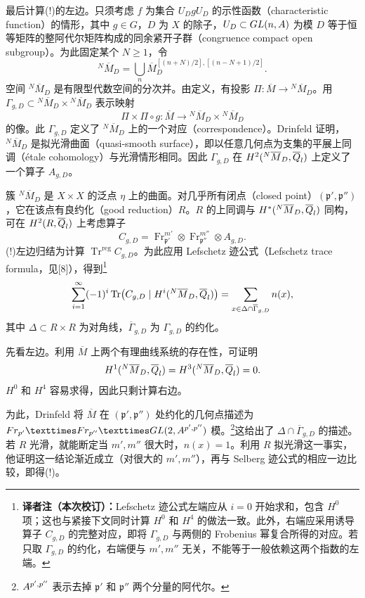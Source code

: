 最后计算(!)的左边。只须考虑 $f$ 为集合 $U_DgU_D$ 的示性函数（characteristic function）的情形，其中 $g\in G$，$D$ 为 $X$ 的除子，$U_D\subset GL(n,A)$ 为模 $D$ 等于恒等矩阵的整阿代尔矩阵构成的同余紧开子群（congruence compact open subgroup）。为此固定某个 $N\geq1$，令
\[
 {}^N\overline M_D=
 \bigcup_n\overline M_D^{[(n+N)/2],[(n-N+1)/2]}.
\]
空间 ${}^N\overline M_D$ 是有限型代数空间的分次并。由定义，有投影 $\Pi:\overline M\longrightarrow{}^N\overline M_D$。用
$\Gamma_{g,D}\subset{}^N\overline M_D\times{}^N\overline M_D$ 表示映射
\[
 \Pi\times\Pi\circ g:\overline M
 \longrightarrow{}^N\overline M_D\times{}^N\overline M_D
\]
的像。此 $\Gamma_{g,D}$ 定义了 ${}^N\overline M_D$ 上的一个对应（correspondence）。Drinfeld 证明，${}^N\overline M_D$ 是拟光滑曲面（quasi-smooth surface），即以任意几何点为支集的平展上同调（étale cohomology）与光滑情形相同。因此 $\Gamma_{g,D}$ 在 $H^2({}^N\overline M_D,\overline{Q}_l)$ 上定义了一个算子 $A_{g,D}$。

簇 ${}^N\overline M_D$ 是 $X\times X$ 的泛点 $\eta$ 上的曲面。对几乎所有闭点（closed point）$(\mathfrak p',\mathfrak p'')$，它在该点有良约化（good reduction）$R$。$R$ 的上同调与 $H^*({}^N\overline M_D,\overline{Q}_l)$ 同构，可在 $H^2(R,\overline{Q}_l)$ 上考虑算子
\[
 C_{g,D}=\operatorname{Fr}_{\mathfrak p'}^{m'}\otimes
 \operatorname{Fr}_{\mathfrak p''}^{m''}\otimes A_{g,D}.
\]
(!)左边归结为计算 $\operatorname{Tr}^{\mathrm{reg}}C_{g,D}$。为此应用 Lefschetz 迹公式（Lefschetz trace formula，见[8]），得到\footnote{\textbf{译者注（本次校订）：}Lefschetz 迹公式左端应从 $i=0$ 开始求和，包含 $H^0$ 项；这也与紧接下文同时计算 $H^0$ 和 $H^4$ 的做法一致。此外，右端应采用诱导算子 $C_{g,D}$ 的完整对应，即将 $\Gamma_{g,D}$ 与两侧的 Frobenius 幂复合所得的对应。若只取 $\Gamma_{g,D}$ 的约化，右端便与 $m',m''$ 无关，不能等于一般依赖这两个指数的左端。}
\[
 \sum_{i=1}^{\infty}(-1)^i\Tr\bigl(C_{g,D}\mid
 H^i({}^N\overline M_D,\overline\Q_l)\bigr)
 =\sum_{x\in\Delta\cap\overline\Gamma_{g,D}}n(x),
\]
其中 $\Delta\subset R\times R$ 为对角线，$\overline\Gamma_{g,D}$ 为 $\Gamma_{g,D}$ 的约化。

先看左边。利用 $\overline M$ 上两个有理曲线系统的存在性，可证明
\[
 H^1({}^N\overline M_D,\overline{Q}_l)
 =H^3({}^N\overline M_D,\overline{Q}_l)=0.
\]
$H^0$ 和 $H^4$ 容易求得，因此只剩计算右边。

为此，Drinfeld 将 $\overline M$ 在 $(\mathfrak p',\mathfrak p'')$ 处约化的几何点描述为
$\operatorname{Fr}_{\mathfrak p'}\times\operatorname{Fr}_{\mathfrak p''}\times\GL(2,\A^{\mathfrak p',\mathfrak p''})$ 模。\footnote{$A^{p',p''}$ 表示去掉 $\mathfrak p'$ 和 $\mathfrak p''$ 两个分量的阿代尔。}这给出了 $\Delta\cap\overline\Gamma_{g,D}$ 的描述。若 $R$ 光滑，就能断定当 $m',m''$ 很大时，$n(x)=1$。利用 $R$ 拟光滑这一事实，他证明这一结论渐近成立（对很大的 $m',m''$），再与 Selberg 迹公式的相应一边比较，即得(!)。

